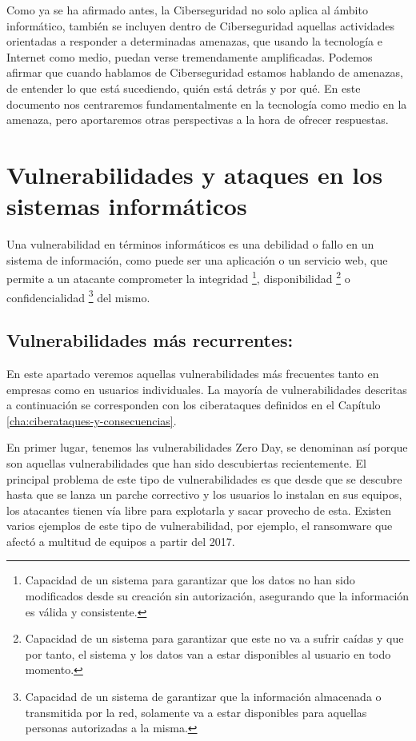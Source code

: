 Como ya se ha afirmado antes, la Ciberseguridad no solo aplica al ámbito informático, también se incluyen dentro de Ciberseguridad 
aquellas actividades orientadas a responder a determinadas amenazas, que usando la tecnología e Internet como medio, puedan 
verse tremendamente amplificadas. Podemos afirmar que cuando hablamos de Ciberseguridad estamos hablando de amenazas, 
de entender lo que está sucediendo, quién está detrás y por qué. En este documento nos centraremos fundamentalmente en la 
tecnología como medio en la amenaza, pero aportaremos otras perspectivas a la hora de ofrecer respuestas.




\chapter{Vulnerabilidades y ataques en los sistemas informáticos}
\label{cha:vulneravilidades-y-ataques}

Una vulnerabilidad en términos informáticos es una debilidad o fallo en un sistema de información, como puede ser una aplicación o un servicio web, que permite a un atacante comprometer la integridad \footnote{Capacidad de un sistema para garantizar que los datos no han sido modificados desde su creación sin autorización, asegurando que la información es válida y consistente.}, disponibilidad \footnote{Capacidad de un sistema para garantizar que este no va a sufrir caídas y que por tanto, el sistema y los datos van a estar disponibles al usuario en todo momento.} o confidencialidad \footnote{Capacidad de un sistema de garantizar que la información almacenada o transmitida por la red, solamente va a estar disponibles para aquellas personas autorizadas a la misma.} del mismo.

\section{Vulnerabilidades más recurrentes:}
En este apartado veremos aquellas vulnerabilidades más frecuentes tanto en empresas como en usuarios individuales. La mayoría de vulnerabilidades descritas a continuación se corresponden con los ciberataques definidos en el Capítulo \ref{cha:ciberataques-y-consecuencias}.

En primer lugar, tenemos las vulnerabilidades Zero Day, se denominan así porque son aquellas 
vulnerabilidades que han sido descubiertas recientemente. El principal problema de este tipo de 
vulnerabilidades es que desde que se descubre hasta que se lanza un parche correctivo y los 
usuarios lo instalan en sus equipos, los atacantes tienen vía libre para explotarla y sacar provecho 
de esta. Existen varios ejemplos de este tipo de vulnerabilidad, por ejemplo, el ransomware que afectó a 
multitud de equipos a partir del 2017.

